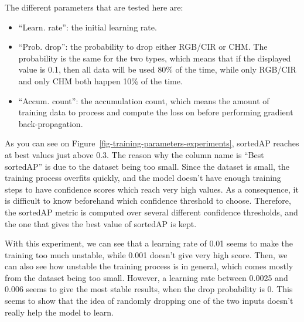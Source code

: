 \documentclass[
  letterpaper,
  DIV=11,
  numbers=noendperiod]{scrartcl}
\providecommand{\tightlist}{%
  \setlength{\itemsep}{0pt}\setlength{\parskip}{0pt}}\usepackage{longtable,booktabs,array}
\begin{document}
The different parameters that are tested here are:

\begin{itemize}
\tightlist
\item
  ``Learn. rate'': the initial learning rate.
\item
  ``Prob. drop'': the probability to drop either RGB/CIR or CHM. The
  probability is the same for the two types, which means that if the
  displayed value is 0.1, then all data will be used 80\% of the time,
  while only RGB/CIR and only CHM both happen 10\% of the time.
\item
  ``Accum. count'': the accumulation count, which means the amount of
  training data to process and compute the loss on before performing
  gradient back-propagation.
\end{itemize}

As you can see on Figure~\ref{fig-training-parameters-experiments},
sortedAP reaches at best values just above 0.3. The reason why the
column name is ``Best sortedAP'' is due to the dataset being too small.
Since the dataset is small, the training process overfits quickly, and
the model doesn't have enough training steps to have confidence scores
which reach very high values. As a consequence, it is difficult to know
beforehand which confidence threshold to choose. Therefore, the sortedAP
metric is computed over several different confidence thresholds, and the
one that gives the best value of sortedAP is kept.

With this experiment, we can see that a learning rate of 0.01 seems to
make the training too much unstable, while 0.001 doesn't give very high
score. Then, we can also see how unstable the training process is in
general, which comes mostly from the dataset being too small. However, a
learning rate between 0.0025 and 0.006 seems to give the most stable
results, when the drop probability is 0. This seems to show that the
idea of randomly dropping one of the two inputs doesn't really help the
model to learn.
\end{document}
